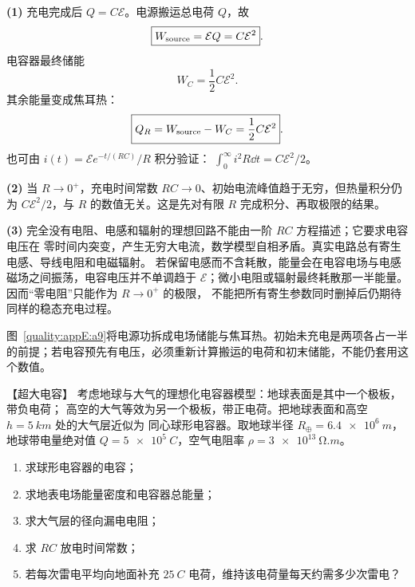 \begin{xesolution}
\textbf{(1)} 充电完成后 $Q=C\mathcal E$。电源搬运总电荷 $Q$，故
\begin{equation}
  \boxed{W_{\rm source}=\mathcal EQ=C\mathcal E^2}.
\end{equation}
电容器最终储能
\[
  W_C=\frac12C\mathcal E^2.
\]
其余能量变成焦耳热：
\begin{equation}
  \boxed{Q_R=W_{\rm source}-W_C=\frac12C\mathcal E^2}.
\end{equation}
也可由 $i(t)=\mathcal E e^{-t/(RC)}/R$ 积分验证：
$\int_0^\infty i^2R\dd t=C\mathcal E^2/2$。

\textbf{(2)} 当 $R\to0^+$，充电时间常数 $RC\to0$、初始电流峰值趋于无穷，但热量积分仍为
$C\mathcal E^2/2$，与 $R$ 的数值无关。这是先对有限 $R$ 完成积分、再取极限的结果。

\textbf{(3)} 完全没有电阻、电感和辐射的理想回路不能由一阶 $RC$ 方程描述；它要求电容电压在
零时间内突变，产生无穷大电流，数学模型自相矛盾。真实电路总有寄生电感、导线电阻和电磁辐射。
若保留电感而不含耗散，能量会在电容电场与电感磁场之间振荡，电容电压并不单调趋于
$\mathcal E$；微小电阻或辐射最终耗散那一半能量。因而“零电阻”只能作为 $R\to0^+$ 的极限，
不能把所有寄生参数同时删掉后仍期待同样的稳态充电过程。


图~\ref{quality:appE:a9}将电源功拆成电场储能与焦耳热。初始未充电是两项各占一半的前提；若电容预先有电压，必须重新计算搬运的电荷和初末储能，不能仍套用这个数值。
\end{xesolution}

\begin{origexamplebox}{【超大电容】}\label{appE:ex:s21-32-11}
考虑地球与大气的理想化电容器模型：地球表面是其中一个极板，带负电荷；
高空的大气等效为另一个极板，带正电荷。把地球表面和高空 $h=\SI{5}{km}$ 处的大气层近似为
同心球形电容器。取地球半径
$R_\oplus=\SI{6.4e6}{m}$，地球带电量绝对值 $Q=\SI{5e5}{C}$，空气电阻率
$\rho=\SI{3e13}{\ohm.m}$。
\begin{enumerate}[label=(\arabic*),leftmargin=2.2em]
  \item 求球形电容器的电容；
  \item 求地表电场能量密度和电容器总能量；
  \item 求大气层的径向漏电电阻；
  \item 求 $RC$ 放电时间常数；
  \item 若每次雷电平均向地面补充 $\SI{25}{C}$ 电荷，维持该电荷量每天约需多少次雷电？
\end{enumerate}

\end{origexamplebox}

